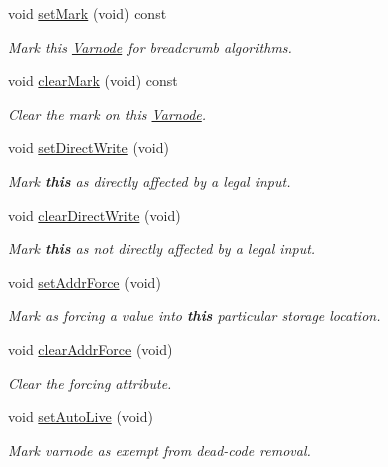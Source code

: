 \begin{DoxyCompactItemize}
void \mbox{\hyperlink{class_varnode_a1ea767056d60173b7a6e57529ea32521}{set\+Mark}} (void) const
\begin{DoxyCompactList}\small\item\em Mark this \mbox{\hyperlink{class_varnode}{Varnode}} for breadcrumb algorithms. \end{DoxyCompactList}\item 
void \mbox{\hyperlink{class_varnode_a2a18f533dc3c9b9befdde490c75b9560}{clear\+Mark}} (void) const
\begin{DoxyCompactList}\small\item\em Clear the mark on this \mbox{\hyperlink{class_varnode}{Varnode}}. \end{DoxyCompactList}\item 
void \mbox{\hyperlink{class_varnode_a2273f333dc5cba75c43461c04459dd28}{set\+Direct\+Write}} (void)
\begin{DoxyCompactList}\small\item\em Mark {\bfseries{this}} as directly affected by a legal input. \end{DoxyCompactList}\item 
void \mbox{\hyperlink{class_varnode_a5f2388a48093153cbe4726a582fb93b0}{clear\+Direct\+Write}} (void)
\begin{DoxyCompactList}\small\item\em Mark {\bfseries{this}} as not directly affected by a legal input. \end{DoxyCompactList}\item 
void \mbox{\hyperlink{class_varnode_a0117b1856bd2977cd1eed1dd8df2dcce}{set\+Addr\+Force}} (void)
\begin{DoxyCompactList}\small\item\em Mark as forcing a value into {\bfseries{this}} particular storage location. \end{DoxyCompactList}\item 
void \mbox{\hyperlink{class_varnode_a0bf342375fe44d491f5570ffd514a08a}{clear\+Addr\+Force}} (void)
\begin{DoxyCompactList}\small\item\em Clear the forcing attribute. \end{DoxyCompactList}\item 
void \mbox{\hyperlink{class_varnode_acf647baf25ce17b30ab31be68208a23f}{set\+Auto\+Live}} (void)
\begin{DoxyCompactList}\small\item\em Mark varnode as exempt from dead-\/code removal. \end{DoxyCompactList}\item 

\end{DoxyCompactItemize}

